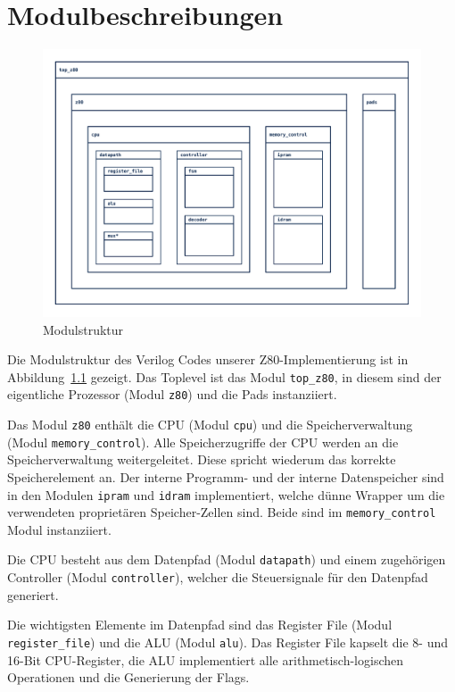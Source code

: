 \documentclass[ngerman, cd=lightcolor]{tudscrreprt}
\begin{document}
\chapter{Modulbeschreibungen}

\begin{figure}[htbp]
  \centering
    \includegraphics[width=.9\textwidth]{resources/pdf/module-structure.pdf}
  \caption{Modulstruktur}
  \label{img:module-structure}
\end{figure}

\noindent
Die Modulstruktur des Verilog Codes unserer Z80-Implementierung ist in
Abbildung~\ref{img:module-structure} gezeigt. Das Toplevel ist das Modul
\texttt{top\_z80}, in diesem sind der eigentliche Prozessor (Modul
\texttt{z80}) und die Pads instanziiert.

Das Modul \texttt{z80} enthält die CPU (Modul \texttt{cpu}) und die
Speicherverwaltung (Modul \texttt{memory\_control}). Alle Speicherzugriffe der
CPU werden an die Speicherverwaltung weitergeleitet. Diese spricht wiederum das
korrekte Speicherelement an. Der interne Programm- und der interne
Datenspeicher sind in den Modulen \texttt{ipram} und \texttt{idram}
implementiert, welche dünne Wrapper um die verwendeten proprietären
Speicher-Zellen sind. Beide sind im \texttt{memory\_control} Modul
instanziiert.

Die CPU besteht aus dem Datenpfad (Modul \texttt{datapath}) und einem
zugehörigen Controller (Modul \texttt{controller}), welcher die Steuersignale
für den Datenpfad generiert.

Die wichtigsten Elemente im Datenpfad sind das Register File (Modul
\texttt{register\_file}) und die ALU (Modul \texttt{alu}). Das Register File
kapselt die 8- und 16-Bit CPU-Register, die ALU implementiert alle
arithmetisch-logischen Operationen und die Generierung der Flags.
\end{document}
